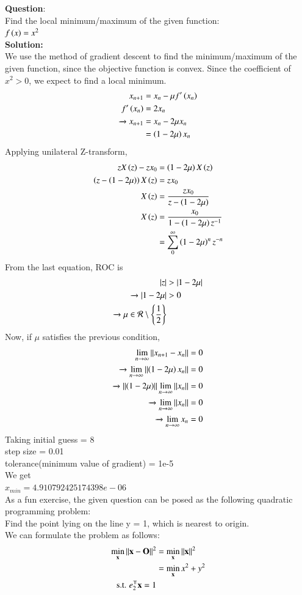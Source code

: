 \documentclass[journal]{IEEEtran}
\begin{document}
\textbf{Question}:\\
Find the local minimum/maximum of the given function:\\
$f\left(x\right) = x^2$
\\
\textbf{Solution: }\\
We use the method of gradient descent to find the minimum/maximum of the given function, since the objective function is convex.
Since the coefficient of $x^2 > 0$, we expect to find a local minimum.
\begin{align}
    x_{n+1} &= x_n - \mu f^{\prime}\left(x_n\right)\\
    f^{\prime}\left(x_n\right) &= 2x_n\\
    \xrightarrow{} x_{n+1} &= x_n - 2\mu x_n \\
    &= \left(1-2\mu\right)x_n
\end{align}
Applying unilateral Z-transform,
\begin{align}
    zX\left(z\right) - zx_0 &= \left(1-2\mu\right)X\left(z\right)\\
    \left(z - \left(1-2\mu\right)\right)X\left(z\right) &= zx_0\\
    X\left(z\right) &= \frac{zx_0}{z - \left(1-2\mu\right)}\\
    X\left(z\right) &= \frac{x_0}{1 - \left(1-2\mu\right)z^{-1}}\\
    &= \sum_{0}^{\infty} \left(1-2\mu\right)^n z^{-n}
\end{align}
From the last equation, ROC is 
\begin{align}
    |z| &> |1-2\mu|\\
    \xrightarrow{} |1-2\mu| &> 0\\
    \xrightarrow{} \mu \in \mathcal{R} \setminus \left\{\frac{1}{2}\right\}
\end{align}
Now, if $\mu$ satisfies the previous condition,
\begin{align}
    \lim_{n \to \infty} \left\lVert x_{n+1} - x_n\right\rVert = 0\\
    \xrightarrow{} \lim_{n \to \infty} \left\lVert\left(1-2\mu\right)x_n\right\rVert = 0\\
    \xrightarrow{} \left\lVert\left(1-2\mu\right)\right\rVert\lim_{n \to \infty} \left\lVert x_n\right\rVert = 0\\
    \xrightarrow{} \lim_{n \to \infty} \left\lVert x_n\right\rVert = 0\\
    \xrightarrow{} \lim_{n \to \infty} x_n = 0
\end{align}
Taking initial guess = 8\\ step size = 0.01\\ tolerance(minimum value of gradient) = 1e-5\\ We get \\
$x_{min} = 4.910792425174398e-06$\\
As a fun exercise, the given question can be posed as the following quadratic programming problem:\\
Find the point lying on the line y = 1, which is nearest to origin.
\\ We can formulate the problem as follows:
\begin{align}
    \min_{\vec{x}} \norm{\vec{x} - \vec{O}}^2 &= \min_{\vec{x}} \norm{\vec{x}}^2 \\
    &= \min_{\vec{x}} {x^2 + y^2}\\
    \text{s.t. } e_2^{\Top}\vec{x} = 1
\end{align}
\end{document}
